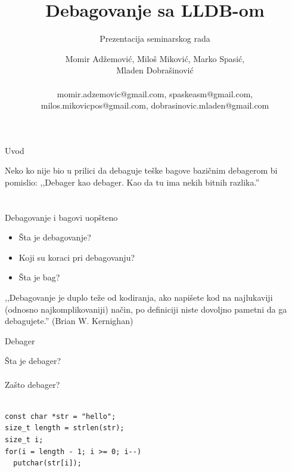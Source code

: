 \documentclass[bookmarks=true,bookmarksopen=true,pdfborder={0 0 0},pdfhighlight={/N},linkbordercolor={.5 .5 .5},implicit=false,unicode,xcolor={table}]{beamer}
\begin{document}
\title{Debagovanje sa LLDB-om}
\author{Momir Adžemović, Miloš Miković, Marko Spasić,\\ Mladen Dobrašinović\\~\\\small momir.adzemovic@gmail.com, spaskeasm@gmail.com,\\ \small milos.mikovicpos@gmail.com, dobrasinovic.mladen@gmail.com}
\subtitle{Prezentacija seminarskog rada}
\date{}


\begin{frame}
  
  \titlepage{}
  
\end{frame}

\begin{frame}{Uvod}
  
  Neko ko nije bio u prilici da debaguje teške bagove bazičnim debagerom bi pomislio: ,,Debager kao debager. Kao da tu ima nekih bitnih razlika.''

\end{frame}

\section{}
\begin{frame}{Debagovanje i bagovi uopšteno}
  \begin{itemize}
  \item Šta je debagovanje?
  \item Koji su koraci pri debagovanju?
  \item Šta je bag?
  \end{itemize}
  ,,Debagovanje je duplo teže od kodiranja, ako napišete kod na najlukaviji (odnosno najkomplikovaniji) način, po definiciji niste dovoljno pametni da ga debagujete.'' (Brian W. Kernighan)
\end{frame}

\begin{frame}[fragile]{Debager}

  Šta je debager?\\~\\

  Zašto debager?\\~\\
  
    \begin{lstlisting}
const char *str = "hello";
size_t length = strlen(str);
size_t i;
for(i = length - 1; i >= 0; i--)
  putchar(str[i]);\end{lstlisting}
\end{frame}
\end{document}
